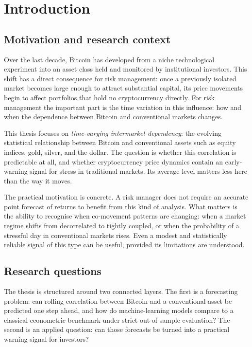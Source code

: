 \section{Introduction}

\subsection{Motivation and research context}

Over the last decade, Bitcoin has developed from a niche technological experiment into an asset class held and monitored by institutional investors. This shift has a direct consequence for risk management: once a previously isolated market becomes large enough to attract substantial capital, its price movements begin to affect portfolios that hold no cryptocurrency directly. For risk management the important part is the time variation in this influence: how and when the dependence between Bitcoin and conventional markets changes.

This thesis focuses on \emph{time-varying intermarket dependency}: the evolving statistical relationship between Bitcoin and conventional assets such as equity indices, gold, silver, and the dollar. The question is whether this correlation is predictable at all, and whether cryptocurrency price dynamics contain an early-warning signal for stress in traditional markets. Its average level matters less here than the way it moves.

The practical motivation is concrete. A risk manager does not require an accurate point forecast of returns to benefit from this kind of analysis. What matters is the ability to recognise when co-movement patterns are changing: when a market regime shifts from decorrelated to tightly coupled, or when the probability of a stressful day in conventional markets rises. Even a modest and statistically reliable signal of this type can be useful, provided its limitations are understood.

\subsection{Research questions}

The thesis is structured around two connected layers. The first is a forecasting problem: can rolling correlation between Bitcoin and a conventional asset be predicted one step ahead, and how do machine-learning models compare to a classical econometric benchmark under strict out-of-sample evaluation? The second is an applied question: can those forecasts be turned into a practical warning signal for investors?

